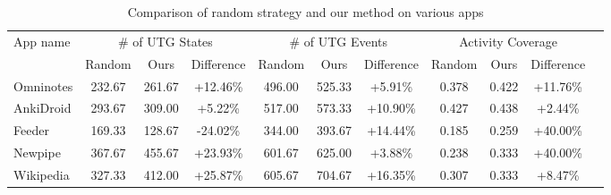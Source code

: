 \documentclass[
	letterpaper, %
	10pt, %
]{article} %
\begin{document}
\begin{table}[ht]\small
\centering
\begin{tabular}{lcccccccccc}
\toprule
\multirow{2}{*}{App name} 
& \multicolumn{3}{c}{\# of UTG States} 
& \multicolumn{3}{c}{\# of UTG Events} 
& \multicolumn{3}{c}{Activity Coverage} \\
\cmidrule(lr){2-4} \cmidrule(lr){5-7} \cmidrule(lr){8-10}
& Random & Ours & Difference 
& Random & Ours & Difference 
& Random & Ours & Difference \\
\midrule
Omninotes & 232.67 & \cellcolor{gray!15}261.67 & \cellcolor{gray!25}+12.46\% 
          & 496.00 & \cellcolor{gray!15}525.33 & \cellcolor{gray!25}+5.91\%
          & 0.378 & \cellcolor{gray!15}0.422 & \cellcolor{gray!25}+11.76\% \\
AnkiDroid & 293.67 & \cellcolor{gray!15}309.00 & \cellcolor{gray!25}+5.22\% 
          & 517.00 & \cellcolor{gray!15}573.33 & \cellcolor{gray!25}+10.90\% 
          & 0.427 & \cellcolor{gray!15}0.438 & \cellcolor{gray!25}+2.44\% \\
Feeder    & 169.33 & \cellcolor{gray!15}128.67 & \cellcolor{gray!25}-24.02\% 
          & 344.00 & \cellcolor{gray!15}393.67 & \cellcolor{gray!25}+14.44\% 
          & 0.185 & \cellcolor{gray!15}0.259 & \cellcolor{gray!25}+40.00\% \\
Newpipe   & 367.67 & \cellcolor{gray!15}455.67 & \cellcolor{gray!25}+23.93\% 
          & 601.67 & \cellcolor{gray!15}625.00 & \cellcolor{gray!25}+3.88\% 
          & 0.238 & \cellcolor{gray!15}0.333 & \cellcolor{gray!25}+40.00\% \\
Wikipedia & 327.33 & \cellcolor{gray!15}412.00 & \cellcolor{gray!25}+25.87\% 
          & 605.67 & \cellcolor{gray!15}704.67 & \cellcolor{gray!25}+16.35\% 
          & 0.307 & \cellcolor{gray!15}0.333 & \cellcolor{gray!25}+8.47\% \\
\bottomrule
\end{tabular}
\caption{Comparison of random strategy and our method on various apps}
\end{table}
\end{document}
